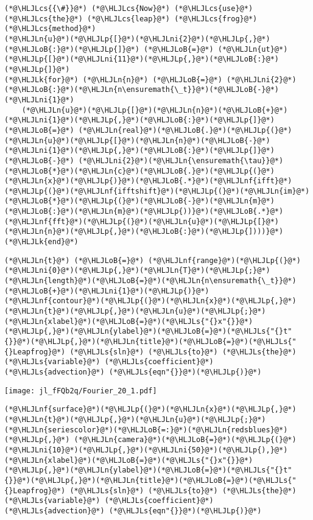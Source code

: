 \documentclass[12pt,a4paper]{article}
\newcommand{\HLJLk}[1]{\textcolor[RGB]{148,91,176}{\textbf{#1}}}
\newcommand{\HLJLn}[1]{#1}
\newcommand{\HLJLnf}[1]{\textcolor[RGB]{66,102,213}{#1}}
\newcommand{\HLJLs}[1]{\textcolor[RGB]{201,61,57}{#1}}
\newcommand{\HLJLni}[1]{\textcolor[RGB]{59,151,46}{#1}}
\newcommand{\HLJLoB}[1]{\textcolor[RGB]{102,102,102}{\textbf{#1}}}
\newcommand{\HLJLp}[1]{#1}
\newcommand{\HLJLcs}[1]{\textcolor[RGB]{153,153,119}{\textit{#1}}}
\begin{document}
\begin{lstlisting}
(*@\HLJLcs{{\#}}@*) (*@\HLJLcs{Now}@*) (*@\HLJLcs{use}@*) (*@\HLJLcs{the}@*) (*@\HLJLcs{leap}@*) (*@\HLJLcs{frog}@*) (*@\HLJLcs{method}@*)
(*@\HLJLn{u}@*)(*@\HLJLp{[}@*)(*@\HLJLni{2}@*)(*@\HLJLp{,}@*)(*@\HLJLoB{:}@*)(*@\HLJLp{]}@*) (*@\HLJLoB{=}@*) (*@\HLJLn{ut}@*)(*@\HLJLp{[}@*)(*@\HLJLni{11}@*)(*@\HLJLp{,}@*)(*@\HLJLoB{:}@*)(*@\HLJLp{]}@*)
(*@\HLJLk{for}@*) (*@\HLJLn{n}@*) (*@\HLJLoB{=}@*) (*@\HLJLni{2}@*)(*@\HLJLoB{:}@*)(*@\HLJLn{n\ensuremath{\_t}}@*)(*@\HLJLoB{-}@*)(*@\HLJLni{1}@*)
    (*@\HLJLn{u}@*)(*@\HLJLp{[}@*)(*@\HLJLn{n}@*)(*@\HLJLoB{+}@*)(*@\HLJLni{1}@*)(*@\HLJLp{,}@*)(*@\HLJLoB{:}@*)(*@\HLJLp{]}@*) (*@\HLJLoB{=}@*) (*@\HLJLn{real}@*)(*@\HLJLoB{.}@*)(*@\HLJLp{(}@*)(*@\HLJLn{u}@*)(*@\HLJLp{[}@*)(*@\HLJLn{n}@*)(*@\HLJLoB{-}@*)(*@\HLJLni{1}@*)(*@\HLJLp{,}@*)(*@\HLJLoB{:}@*)(*@\HLJLp{]}@*) (*@\HLJLoB{-}@*) (*@\HLJLni{2}@*)(*@\HLJLn{\ensuremath{\tau}}@*)(*@\HLJLoB{*}@*)(*@\HLJLn{c}@*)(*@\HLJLoB{.}@*)(*@\HLJLp{(}@*)(*@\HLJLn{x}@*)(*@\HLJLp{)}@*)(*@\HLJLoB{.*}@*)(*@\HLJLnf{ifft}@*)(*@\HLJLp{(}@*)(*@\HLJLnf{ifftshift}@*)(*@\HLJLp{(}@*)(*@\HLJLn{im}@*)(*@\HLJLoB{*}@*)(*@\HLJLp{(}@*)(*@\HLJLoB{-}@*)(*@\HLJLn{m}@*)(*@\HLJLoB{:}@*)(*@\HLJLn{m}@*)(*@\HLJLp{))}@*)(*@\HLJLoB{.*}@*)(*@\HLJLnf{fft}@*)(*@\HLJLp{(}@*)(*@\HLJLn{u}@*)(*@\HLJLp{[}@*)(*@\HLJLn{n}@*)(*@\HLJLp{,}@*)(*@\HLJLoB{:}@*)(*@\HLJLp{])))}@*)
(*@\HLJLk{end}@*)
\end{lstlisting}


\begin{lstlisting}
(*@\HLJLn{t}@*) (*@\HLJLoB{=}@*) (*@\HLJLnf{range}@*)(*@\HLJLp{(}@*)(*@\HLJLni{0}@*)(*@\HLJLp{,}@*)(*@\HLJLn{T}@*)(*@\HLJLp{;}@*)(*@\HLJLn{length}@*)(*@\HLJLoB{=}@*)(*@\HLJLn{n\ensuremath{\_t}}@*)(*@\HLJLoB{+}@*)(*@\HLJLni{1}@*)(*@\HLJLp{)}@*)
(*@\HLJLnf{contour}@*)(*@\HLJLp{(}@*)(*@\HLJLn{x}@*)(*@\HLJLp{,}@*)(*@\HLJLn{t}@*)(*@\HLJLp{,}@*)(*@\HLJLn{u}@*)(*@\HLJLp{;}@*)(*@\HLJLn{xlabel}@*)(*@\HLJLoB{=}@*)(*@\HLJLs{"{}x"{}}@*)(*@\HLJLp{,}@*)(*@\HLJLn{ylabel}@*)(*@\HLJLoB{=}@*)(*@\HLJLs{"{}t"{}}@*)(*@\HLJLp{,}@*)(*@\HLJLn{title}@*)(*@\HLJLoB{=}@*)(*@\HLJLs{"{}Leapfrog}@*) (*@\HLJLs{sln}@*) (*@\HLJLs{to}@*) (*@\HLJLs{the}@*) (*@\HLJLs{variable}@*) (*@\HLJLs{coefficient}@*) (*@\HLJLs{advection}@*) (*@\HLJLs{eqn"{}}@*)(*@\HLJLp{)}@*)
\end{lstlisting}

\texttt{[image: jl\_fFQb2q/Fourier\_20\_1.pdf]}

\begin{lstlisting}
(*@\HLJLnf{surface}@*)(*@\HLJLp{(}@*)(*@\HLJLn{x}@*)(*@\HLJLp{,}@*)(*@\HLJLn{t}@*)(*@\HLJLp{,}@*)(*@\HLJLn{u}@*)(*@\HLJLp{;}@*)(*@\HLJLn{seriescolor}@*)(*@\HLJLoB{=:}@*)(*@\HLJLn{redsblues}@*)(*@\HLJLp{,}@*) (*@\HLJLn{camera}@*)(*@\HLJLoB{=}@*)(*@\HLJLp{(}@*)(*@\HLJLni{10}@*)(*@\HLJLp{,}@*)(*@\HLJLni{50}@*)(*@\HLJLp{),}@*)
(*@\HLJLn{xlabel}@*)(*@\HLJLoB{=}@*)(*@\HLJLs{"{}x"{}}@*)(*@\HLJLp{,}@*)(*@\HLJLn{ylabel}@*)(*@\HLJLoB{=}@*)(*@\HLJLs{"{}t"{}}@*)(*@\HLJLp{,}@*)(*@\HLJLn{title}@*)(*@\HLJLoB{=}@*)(*@\HLJLs{"{}Leapfrog}@*) (*@\HLJLs{sln}@*) (*@\HLJLs{to}@*) (*@\HLJLs{the}@*) (*@\HLJLs{variable}@*) (*@\HLJLs{coefficient}@*) (*@\HLJLs{advection}@*) (*@\HLJLs{eqn"{}}@*)(*@\HLJLp{)}@*)
\end{lstlisting}
\end{document}

